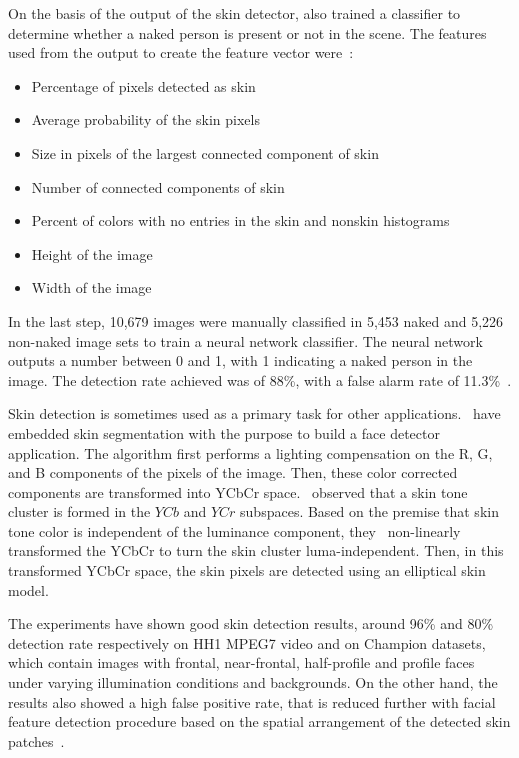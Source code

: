 On the basis of the output of the skin detector, \citet{jones:02} also trained a classifier to determine whether a naked person is present or not in the scene. The features used from the output to create the feature vector were~\citep{jones:02}:
\begin{itemize}
    \item Percentage of pixels detected as skin
    \item Average probability of the skin pixels
    \item Size in pixels of the largest connected component of skin
    \item Number of connected components of skin
    \item Percent of colors with no entries in the skin and nonskin histograms
    \item Height of the image
    \item Width of the image
\end{itemize}

In the last step, 10,679 images were manually classified in 5,453 naked and 5,226 non-naked image sets to train a neural network classifier. The neural network outputs a number between 0 and 1, with 1 indicating a naked person in the image. The detection rate achieved was of 88\%, with a false alarm rate of 11.3\%~\citep{jones:02}.

Skin detection is sometimes used as a primary task for other applications. \citet{hsu:02}~have embedded skin segmentation with the purpose to build a face detector application. The algorithm first performs a lighting compensation on the R, G, and B components of the pixels of the image. Then, these color corrected components are transformed into YCbCr space. \citet{hsu:02}~observed that a skin tone cluster is formed in the $YCb$ and $YCr$ subspaces. Based on the premise that skin tone color is independent of the luminance component, they~\citep{hsu:02} non-linearly transformed the YCbCr to turn the skin cluster luma-independent. Then, in this transformed YCbCr space, the skin pixels are detected using an elliptical skin model.

The experiments have shown good skin detection results, around 96\% and 80\% detection rate respectively on HH1 MPEG7 video and on Champion datasets, which contain images with frontal, near-frontal, half-profile and profile faces under varying illumination conditions and backgrounds. On the other hand, the results also showed a high false positive rate, that is reduced further with facial feature detection procedure based on the spatial arrangement of the detected skin patches~\citep{hsu:02}.

